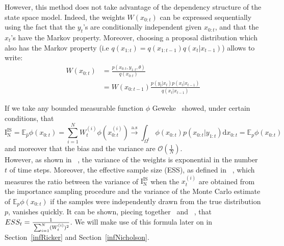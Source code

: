 \documentclass[12pt]{article}
\begin{document}
	However, this method does not take advantage of the dependency structure of the state space model. Indeed, the weights $W(x_{0:t})$ can be expressed sequentially using the fact that the $y_t$'s are conditionally independent given $x_{0:t}$, and that the $x_t$'s have the Markov property. Moreover, choosing a proposal distribution which also has the Markov property (i.e $q(x_{1:t})=q(x_{1:t-1})q(x_t| x_{t-1})$) allows to write:
	\begin{align}
	W(x_{0:t}) & = \frac{p(x_{0:t},y_{1:t}, \theta)}{q(x_{0:t})} \\
	& = W(x_{0:t-1})\frac{p(y_t|x_t)p(x_t|x_{t-1})}{q(x_t|x_{t-1})}
	\end{align}
	
	If we take any bounded measurable function $\phi$ Geweke~\cite{Geweke1989} showed, under certain conditions, that
	\begin{equation*}
	 \mathrm{I_N^{IS}}=\mathbb{E}_{\hat{p}}\phi(x_{0:t}) = \sum_{i=1}^{N} W_t^{(i)} \phi(x_{0:t}^{(i)}) \xrightarrow{\mathrm{a.s}} \int_{\Omega^t} \phi({x_{0:t}})p(x_{0:t}|y_{1:t})\mathrm{d}x_{0:t}=\mathbb{E}_{p}\phi(x_{0:t})
	\end{equation*}
	and moreover that the bias and the variance are $\mathcal{O}(\frac{1}{N})$.\\
	
	However, as shown in ~\cite{kong1994sequential}, the variance of the weights is exponential in the number $t$ of time steps. Moreover, the effective sample size (ESS), as defined in ~\cite{liu2008monte}, which measures the ratio between the variance of $\mathrm{I_N^{IS}}$ when the $x_t^{(i)}$ are obtained from the importance sampling procedure and the variance of the Monte Carlo estimate of $\mathbb{E}_{p}\phi(x_{0:t})$ if the samples were independently drawn from the true distribution $p$, vanishes quickly.  It can be shown, piecing together~\cite[][pp.~35-36]{liu2008monte} and ~\cite[][pp.~98-100]{robert2009introducing}, that  $ESS_t = \frac{1}{\strut \sum_{i=1}^{N} (W_t^{(i)})^2}$. We will make use of this formula later on in Section~\ref{infRicker} and Section~\ref{infNicholson}.
	
\end{document}
